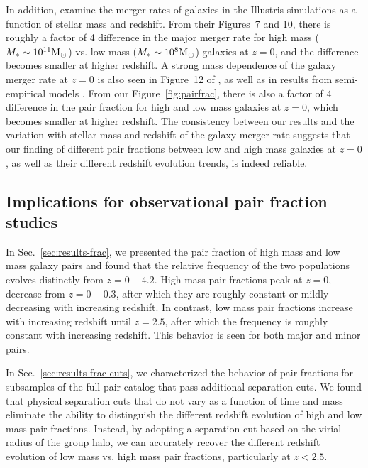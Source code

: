 \documentclass[linenumbers,twocolumn]{aastex631}
\begin{document}
        In addition, \cite{RG2015} examine the merger rates of galaxies in the Illustris simulations as a function of stellar mass and redshift.
        From their Figures~7 and 10, there is roughly a factor of 4 difference in the major merger rate for high mass ($M_* \sim 10^{11} \mathrm{M}_\odot$) vs. low mass ($M_* \sim 10^8 \mathrm{M}_\odot$) galaxies at $z=0$, and the difference becomes smaller at higher redshift. 
        A strong mass dependence of the galaxy merger rate at $z=0$ is also seen in Figure~12 of \cite{Guzman-Ortega2023}, as well as in results from semi-empirical models \citep{Stewart2009, Hopkins2010}.
        From our Figure~\ref{fig:pairfrac}, there is also a factor of 4 difference in the pair fraction for high and low mass galaxies at $z=0$, which becomes smaller at higher redshift.
        The consistency between our results and the variation with stellar mass and redshift of the galaxy merger rate suggests that our finding of different pair fractions between low and high mass galaxies at $z=0$, as well as their different redshift evolution trends, is indeed reliable.  

\subsection{Implications for observational pair fraction studies}\label{sec:disc-obs}

    In Sec.~\ref{sec:results-frac}, we presented the pair fraction of high mass and low mass galaxy pairs and found that the relative frequency of the two populations evolves distinctly from $z=0-4.2$. 
    High mass pair fractions peak at $z=0$, decrease from $z=0-0.3$, after which they are roughly constant or mildly decreasing with increasing redshift. 
    In contrast, low mass pair fractions increase with increasing redshift until $z=2.5$, after which the frequency is roughly constant with increasing redshift. 
    This behavior is seen for both major and minor pairs.  

    In Sec.~\ref{sec:results-frac-cuts}, we characterized the behavior of pair fractions for subsamples of the full pair catalog that pass additional separation cuts.
    We found that physical separation cuts that do not vary as a function of time and mass eliminate the ability to distinguish the different redshift evolution of high and low mass pair fractions. 
    Instead, by adopting a separation cut based on the virial radius of the group halo, we can accurately recover the different redshift evolution of low mass vs. high mass pair fractions, particularly at $z<2.5$.
\end{document}
